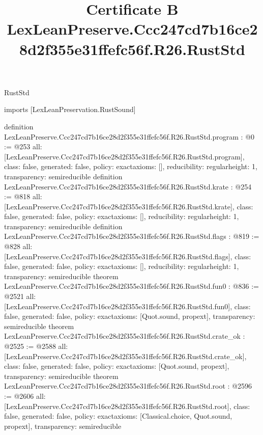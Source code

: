 \begin{lexlean}{RustStd}
\title{Certificate B LexLeanPreserve.Ccc247cd7b16ce28d2f355e31ffefc56f.R26.RustStd}
\begin{coremodule}
imports [LexLeanPreservation.RustSound]

definition LexLeanPreserve.Ccc247cd7b16ce28d2f355e31ffefc56f.R26.RustStd.program : @0 := @253 {
  all: [LexLeanPreserve.Ccc247cd7b16ce28d2f355e31ffefc56f.R26.RustStd.program],
  class: false,
  generated: false,
  policy: exact{axioms: []},
  reducibility: regular{height: 1},
  transparency: semireducible
}
definition LexLeanPreserve.Ccc247cd7b16ce28d2f355e31ffefc56f.R26.RustStd.krate : @254 := @818 {
  all: [LexLeanPreserve.Ccc247cd7b16ce28d2f355e31ffefc56f.R26.RustStd.krate],
  class: false,
  generated: false,
  policy: exact{axioms: []},
  reducibility: regular{height: 1},
  transparency: semireducible
}
definition LexLeanPreserve.Ccc247cd7b16ce28d2f355e31ffefc56f.R26.RustStd.flags : @819 := @828 {
  all: [LexLeanPreserve.Ccc247cd7b16ce28d2f355e31ffefc56f.R26.RustStd.flags],
  class: false,
  generated: false,
  policy: exact{axioms: []},
  reducibility: regular{height: 1},
  transparency: semireducible
}
theorem LexLeanPreserve.Ccc247cd7b16ce28d2f355e31ffefc56f.R26.RustStd.fun0 : @836 := @2521 {
  all: [LexLeanPreserve.Ccc247cd7b16ce28d2f355e31ffefc56f.R26.RustStd.fun0],
  class: false,
  generated: false,
  policy: exact{axioms: [Quot.sound, propext]},
  transparency: semireducible
}
theorem LexLeanPreserve.Ccc247cd7b16ce28d2f355e31ffefc56f.R26.RustStd.crate_ok : @2525 := @2588 {
  all: [LexLeanPreserve.Ccc247cd7b16ce28d2f355e31ffefc56f.R26.RustStd.crate_ok],
  class: false,
  generated: false,
  policy: exact{axioms: [Quot.sound, propext]},
  transparency: semireducible
}
theorem LexLeanPreserve.Ccc247cd7b16ce28d2f355e31ffefc56f.R26.RustStd.root : @2596 := @2606 {
  all: [LexLeanPreserve.Ccc247cd7b16ce28d2f355e31ffefc56f.R26.RustStd.root],
  class: false,
  generated: false,
  policy: exact{axioms: [Classical.choice, Quot.sound, propext]},
  transparency: semireducible
}


\end{coremodule}
\end{lexlean}
